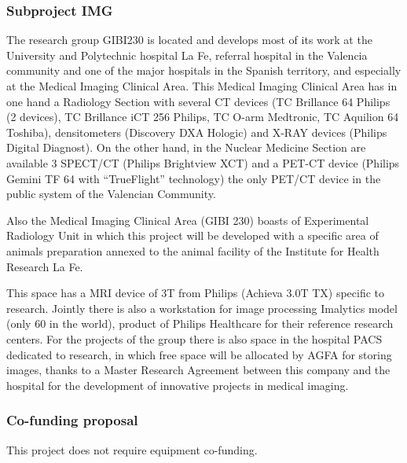 \subsubsection*{Subproject IMG}

The research group GIBI230 is located and develops most of its work at the University and Polytechnic hospital La Fe, referral hospital in the Valencia community and one of the major hospitals in the Spanish territory, and especially at the Medical Imaging Clinical Area. 
This Medical Imaging Clinical Area has in one hand a Radiology Section with several CT devices (TC Brillance 64 Philips (2 devices), TC Brillance iCT 256 Philips, TC O-arm
Medtronic, TC Aquilion 64 Toshiba), densitometers (Discovery DXA Hologic) and X-RAY devices (Philips Digital Diagnost). On the other hand, in the Nuclear Medicine Section are available 3 SPECT/CT (Philips Brightview XCT) and a PET-CT device (Philips Gemini TF 64 with “TrueFlight” technology) the only PET/CT device in the public system of the Valencian Community.

Also the Medical Imaging Clinical Area (GIBI 230) boasts of Experimental Radiology Unit in which this project will be developed with a specific area of animals preparation annexed to the animal facility of the Institute for Health Research La Fe.

This space has a MRI device of 3T from Philips (Achieva 3.0T TX) specific to research. Jointly there is also a workstation for image processing Imalytics model (only 60 in the world), product of Philips Healthcare for their reference research centers. For the projects of the group there is also space in the hospital PACS dedicated to research, in which free space will be allocated by AGFA for storing images, thanks to a Master Research Agreement between this company and the hospital for the development of innovative projects in medical imaging.

\subsubsection*{Co-funding proposal}
 This project does not require equipment co-funding. 
